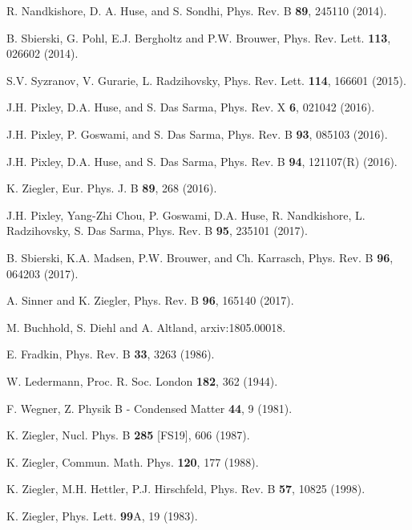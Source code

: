 \documentclass[aps]{revtex4}
\begin{document}
\begin{thebibliography}{99}

R. Nandkishore, D. A. Huse, and S. Sondhi,  Phys. Rev. B {\bf 89}, 245110 (2014).

B. Sbierski, G. Pohl, E.J. Bergholtz and P.W. Brouwer, Phys. Rev. Lett. {\bf 113}, 026602 (2014).

S.V. Syzranov, V. Gurarie, L. Radzihovsky, Phys. Rev. Lett. {\bf 114}, 166601 (2015).

J.H. Pixley, D.A. Huse, and S. Das Sarma, Phys. Rev. X {\bf 6}, 021042 (2016).

J.H. Pixley, P. Goswami, and S. Das Sarma, Phys. Rev. B {\bf 93}, 085103 (2016).

J.H. Pixley, D.A. Huse, and S. Das Sarma, Phys. Rev. B {\bf 94}, 121107(R) (2016).

K. Ziegler, Eur. Phys. J. B {\bf 89}, 268 (2016).

J.H. Pixley, Yang-Zhi Chou, P. Goswami, D.A. Huse, R. Nandkishore, L. Radzihovsky, S. Das Sarma,
Phys. Rev. B {\bf 95}, 235101 (2017).

B. Sbierski, K.A. Madsen, P.W. Brouwer, and Ch. Karrasch, Phys. Rev. B {\bf 96}, 064203 (2017).

A. Sinner and K. Ziegler, Phys. Rev. B {\bf 96}, 165140 (2017). 

M. Buchhold, S. Diehl and A. Altland, arxiv:1805.00018.

E. Fradkin, Phys. Rev. B {\bf 33}, 3263 (1986).

W. Ledermann, Proc. R. Soc. London {\bf 182}, 362 (1944).

F. Wegner, Z. Physik B - Condensed Matter {\bf 44}, 9 (1981).

K. Ziegler, Nucl. Phys. B {\bf 285} [FS19], 606 (1987).

K. Ziegler, Commun. Math. Phys. {\bf 120}, 177 (1988).

K. Ziegler, M.H. Hettler, P.J. Hirschfeld, Phys. Rev. B {\bf 57}, 10825 (1998).


K. Ziegler, Phys. Lett. {\bf 99}A, 19 (1983).


\end{thebibliography}
\end{document}
